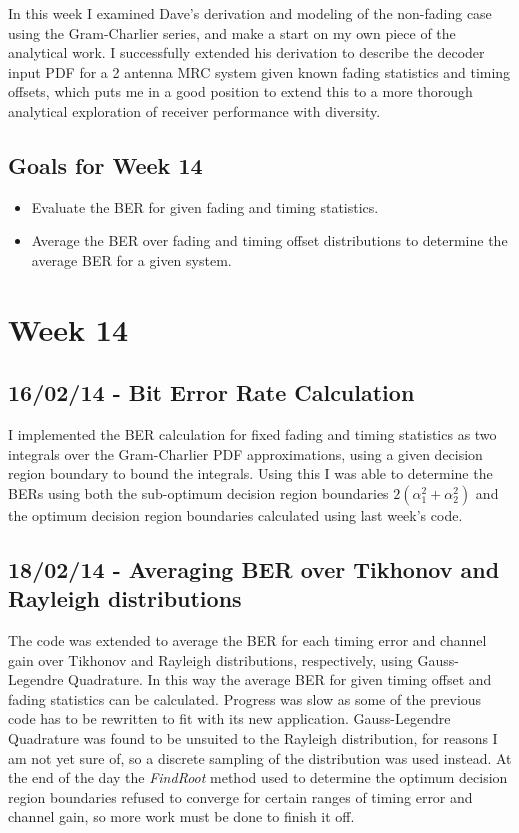 In this week I examined Dave's derivation and modeling of the non-fading
case using the Gram-Charlier series, and make a start on my own piece of
the analytical work. I successfully extended his derivation to describe
the decoder input PDF for a 2 antenna MRC system given known fading
statistics and timing offsets, which puts me in a good position to
extend this to a more thorough analytical exploration of receiver
performance with diversity.

\subsection{Goals for Week 14}

\begin{itemize}
\itemsep1pt\parskip0pt
\item
  Evaluate the BER for given fading and timing statistics.
\item
  Average the BER over fading and timing offset distributions to
  determine the average BER for a given system.
\end{itemize}

\section{Week 14}

\subsection{16/02/14 - Bit Error Rate Calculation}

I implemented the BER calculation for fixed fading and timing statistics
as two integrals over the Gram-Charlier PDF approximations, using a
given decision region boundary to bound the integrals. Using this I was
able to determine the BERs using both the sub-optimum decision region
boundaries $2(\alpha_1^2 + \alpha_2^2)$ and the optimum decision region
boundaries calculated using last week's code.

\subsection{18/02/14 - Averaging BER over Tikhonov and Rayleigh
distributions}

The code was extended to average the BER for each timing error and
channel gain over Tikhonov and Rayleigh distributions, respectively,
using Gauss-Legendre Quadrature. In this way the average BER for given
timing offset and fading statistics can be calculated. Progress was slow
as some of the previous code has to be rewritten to fit with its new
application. Gauss-Legendre Quadrature was found to be unsuited to the
Rayleigh distribution, for reasons I am not yet sure of, so a discrete
sampling of the distribution was used instead. At the end of the day the
\emph{FindRoot} method used to determine the optimum decision region
boundaries refused to converge for certain ranges of timing error and
channel gain, so more work must be done to finish it off.

